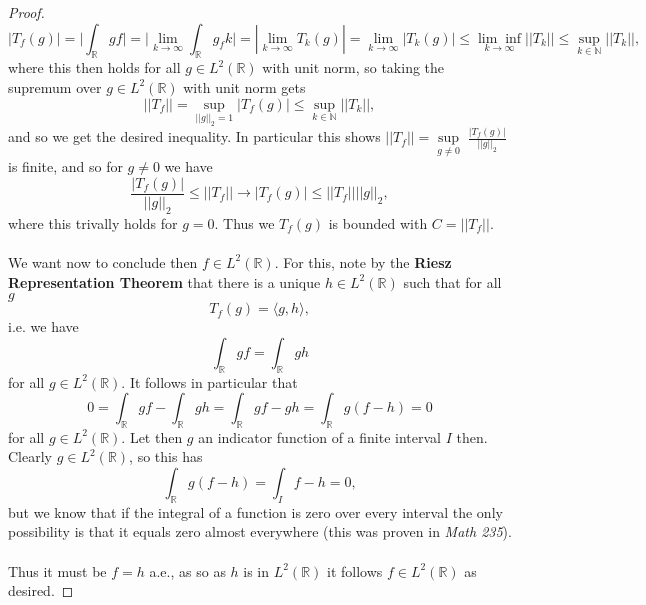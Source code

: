 \documentclass[12pt]{article}
\newcommand{\N}{\mathbb{N}}
\newenvironment{ex}[2][Exercise]{\begin{trivlist}
\item[\hskip \labelsep {\bfseries #1}\hskip \labelsep {\bfseries #2.}]}{\end{trivlist}}
\begin{document}
\begin{ex}{17}
\begin{proof}
        $$|T_f(g)| = \Big |\int_{\mathbb{R}} gf \Big | = \Big | \underset{k \rightarrow \infty}{\lim} \int_\mathbb{R} g_fk \Big | = | \underset{k \rightarrow \infty}{\lim} T_k(g) | = \underset{k \rightarrow \infty}{\lim} |T_k(g)| \leq \underset{k \rightarrow \infty}{\lim\inf} ||T_k|| \leq \underset{k \in \N}{\sup} ||T_k||,$$
        where this then holds for all $g \in L^2(\mathbb{R})$ with unit norm, so taking the supremum over $g \in L^2(\mathbb{R})$ with unit norm gets 
        $$||T_f|| = \underset{||g||_2 = 1}{\sup} |T_f(g)| \leq \underset{k \in \N}{\sup} ||T_k||,$$
        and so we get the desired inequality. In particular this shows $||T_f|| = \underset{g \neq 0}{\sup} \; \frac{|T_f(g)|}{||g||_2}$ is finite, and so for $g \neq 0$ we have
        $$\frac{|T_f(g)|}{||g||_2} \leq ||T_f|| \longrightarrow |T_f(g)| \leq ||T_f||||g||_2,$$
        where this trivally holds for $g = 0$. Thus we $T_f(g)$ is bounded with $C = ||T_f||$. \\ \\
        We want now to conclude then $f \in L^2(\mathbb{R})$. For this, note by the \textbf{Riesz Representation Theorem} that there is a unique $h \in L^2(\mathbb{R})$ such that for all $g$ 
        $$T_f(g) = \langle g, h \rangle,$$
        i.e. we have
        $$\int_\mathbb{R} gf = \int_\mathbb{R} gh$$
        for all $g \in L^2(\mathbb{R})$. It follows in particular that 
        $$0 = \int_\mathbb{R} gf - \int_\mathbb{R} gh = \int_\mathbb{R} gf - gh = \int_\mathbb{R} g(f - h) = 0$$
        for all $g \in L^2(\mathbb{R})$. Let then $g$ an indicator function of a finite interval $I$ then. Clearly $g \in L^2(\mathbb{R})$, so this has 
        $$\int_\mathbb{R} g(f - h) = \int_I f - h = 0,$$
        but we know that if the integral of a function is zero over every interval the only possibility is that it equals zero almost everywhere (this was proven in \textit{Math 235}). \\ \\ Thus it must be $f = h$ a.e., as so as $h$ is in $L^2(\mathbb{R})$ it follows $f \in L^2(\mathbb{R})$ as desired.
    \end{proof}
\end{ex}
\end{document}
